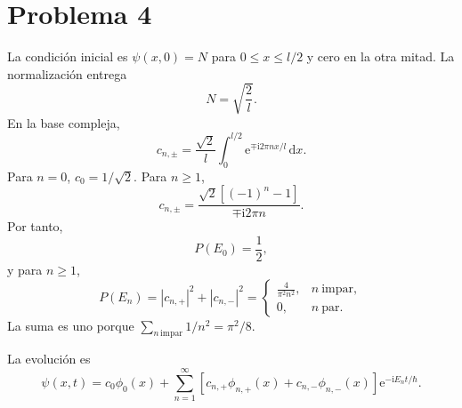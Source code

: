 \documentclass[11pt,a4paper]{article}
\numberwithin{equation}{section}
\renewcommand{\boxed}[1]{#1}
\newcommand{\dd}{\,\mathrm d}
\newcommand{\ii}{\mathrm i}
\newcommand{\e}{\mathrm e}
\newcommand{\hb}{\hbar}
\begin{document}
\section{Problema 4}
La condición inicial es $\psi(x,0)=N$ para $0\le x\le l/2$ y cero en la otra mitad. La normalización entrega
\begin{equation}
\boxed{N=\sqrt{\frac2l}.}
\end{equation}
En la base compleja,
\begin{equation}
c_{n,\pm}=\frac{\sqrt2}{l}\int_0^{l/2}\e^{\mp\ii2\pi nx/l}\dd x.
\end{equation}
Para $n=0$, $c_0=1/\sqrt2$. Para $n\ge1$,
\begin{equation}
c_{n,\pm}=\frac{\sqrt2[(-1)^n-1]}{\mp\ii2\pi n}.
\end{equation}
Por tanto,
\begin{equation}
P(E_0)=\frac12,
\end{equation}
y para $n\ge1$,
\begin{equation}
\boxed{P(E_n)=|c_{n,+}|^2+|c_{n,-}|^2=
\begin{cases}\displaystyle\frac{4}{\pi^2n^2},&n\ \text{impar},\\0,&n\ \text{par}.
\end{cases}}
\end{equation}
La suma es uno porque $\sum_{n\,\mathrm{impar}}1/n^2=\pi^2/8$.

La evolución es
\begin{equation}
\boxed{\psi(x,t)=c_0\phi_0(x)+\sum_{n=1}^{\infty}
\left[c_{n,+}\phi_{n,+}(x)+c_{n,-}\phi_{n,-}(x)\right]\e^{-\ii E_nt/\hb}.}
\end{equation}
\end{document}
